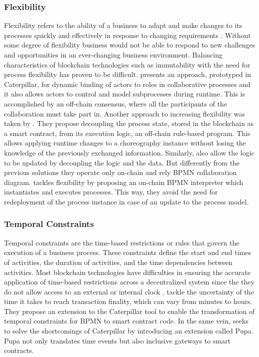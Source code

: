 \subsubsection{Flexibility}\label{sssec:flex}
Flexibility refers to the ability of a business to adapt and make changes to its processes quickly and effectively in response to changing requirements \cite{cognini2018business}. Without some degree of flexibility business would not be able to respond to new challenges and opportunities in an ever-changing business environment. Balancing characteristics of blockchain technologies such as immutability with the need for process flexibility has proven to be difficult. \citeauthor{lopez-pintado_controlled_2022} \cite{lopez-pintado_controlled_2022} presents an approach, prototyped in Caterpillar, for dynamic binding of actors to roles in collaborative processes and it also allows actors to control and model subprocesses during runtime. This is accomplished by an off-chain consensus, where all the participants of the collaboration must take part in. Another approach to increasing flexibility was taken by \citeauthor{corradini_flexible_2022} \cite{corradini_flexible_2022}. They propose decoupling the process state, stored in the blockchain as a smart contract, from its execution logic, an off-chain rule-based program. This allows applying runtime changes to a choreography instance without losing the knowledge of the previously exchanged information. Similarly, \citeauthor{klinger-upgrade} \cite{klinger-upgrade} also allow the logic to be updated by decoupling the logic and the data. But differently from the previous solutions they operate only on-chain and rely BPMN collaboration diagram. \citeauthor{loukil_decentralized_2021} \cite{loukil_decentralized_2021} tackles flexibility by proposing an on-chain BPMN interpreter which instantiates and executes processes. This way, they avoid the need for redeployment of the process instance in case of an update to the process model. 

\subsubsection{Temporal Constraints}\label{sssec:temp}
Temporal constraints are the time-based restrictions or rules that govern the execution of a business process. These constraints define the start and end times of activities, the duration of activities, and the time dependencies between activities. Most blockchain technologies have difficulties in ensuring the accurate application of time-based restrictions across a decentralized system since the they do not allow access to an external or internal clock  \cite{ladleif_time_2020}. \citeauthor{abid_modelling_2020} \cite{abid_modelling_2020} tackle the uncertainty of the time it takes to reach transaction finality, which can vary from minutes to hours. They propose an extension to the Caterpillar tool to enable the transformation of temporal constraints for BPMN to smart contract code. In the same vein, \citeauthor{tonga_naha_pupa_2022} \cite{tonga_naha_pupa_2022} seeks to solve the shortcomings of Caterpillar by introducing an extension called Pupa. Pupa not only translates time events but also inclusive gateways to smart contracts.  


